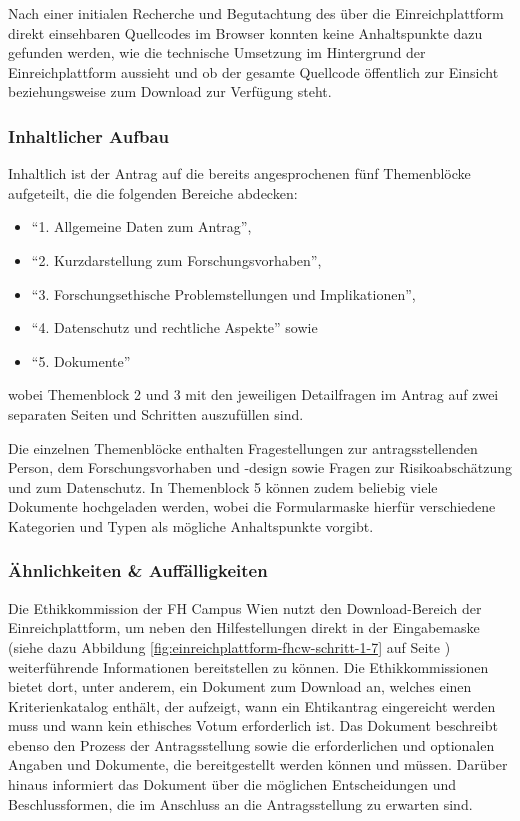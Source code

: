 \documentclass[a4paper,12pt,twoside]{scrreprt}
\begin{document}
\medskip

Nach einer initialen Recherche und Begutachtung des über die Einreichplattform direkt einsehbaren Quellcodes im Browser konnten keine Anhaltspunkte dazu gefunden werden, wie die technische Umsetzung im Hintergrund der Einreichplattform aussieht und ob der gesamte Quellcode öffentlich zur Einsicht beziehungsweise zum Download zur Verfügung steht.

\subsubsection*{Inhaltlicher Aufbau}
\label{sub-sub-sec:fhcw-inhaltlicher-aufbau}

Inhaltlich ist der Antrag auf die bereits angesprochenen fünf Themenblöcke aufgeteilt, die die folgenden Bereiche abdecken:
\begin{itemize}
    \item \enquote{1. Allgemeine Daten zum Antrag},
    \item \enquote{2. Kurzdarstellung zum Forschungsvorhaben},
    \item \enquote{3. Forschungsethische Problemstellungen und Implikationen},
    \item \enquote{4. Datenschutz und rechtliche Aspekte} sowie
    \item \enquote{5. Dokumente}
\end{itemize}

\noindent wobei Themenblock 2 und 3 mit den jeweiligen Detailfragen im Antrag auf zwei separaten Seiten und Schritten auszufüllen sind.

Die einzelnen Themenblöcke enthalten Fragestellungen zur antragsstellenden Person, dem Forschungsvorhaben und -design sowie Fragen zur Risikoabschätzung und zum Datenschutz. In Themenblock 5 können zudem beliebig viele Dokumente hochgeladen werden, wobei die Formularmaske hierfür verschiedene Kategorien und Typen als mögliche Anhaltspunkte vorgibt.

\subsubsection*{Ähnlichkeiten \& Auffälligkeiten}
\label{sub-sub-sec:ähnlichkeiten-auffälligkeiten-fhcw}

Die Ethikkommission der FH Campus Wien nutzt den Download-Bereich der Einreichplattform, um neben den Hilfestellungen direkt in der Eingabemaske (siehe dazu Abbildung \ref{fig:einreichplattform-fhcw-schritt-1-7} auf Seite \pageref{fig:einreichplattform-fhcw-schritt-1-7}) weiterführende Informationen bereitstellen zu können. Die Ethikkommissionen bietet dort, unter anderem, ein Dokument zum Download an, welches einen Kriterienkatalog enthält, der aufzeigt, wann ein Ehtikantrag eingereicht werden muss und wann kein ethisches Votum erforderlich ist. Das Dokument beschreibt ebenso den Prozess der Antragsstellung sowie die erforderlichen und optionalen Angaben und Dokumente, die bereitgestellt werden können und müssen. Darüber hinaus informiert das Dokument über die möglichen Entscheidungen und Beschlussformen, die im Anschluss an die Antragsstellung zu erwarten sind. \cite[1\psqq]{ethikkommission_fh_campus_wien_wissenswertes_2022}
\end{document}
